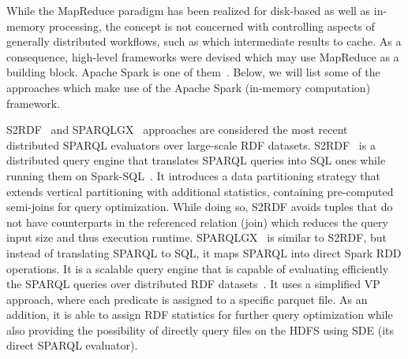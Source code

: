 While the MapReduce paradigm has been realized for disk-based as well as in-memory processing, the concept is not concerned with controlling aspects of generally distributed workflows, such as which intermediate results to cache. 
As a consequence, high-level frameworks were devised which may use MapReduce as a building block.
Apache Spark is one of them~\cite{zaharia2012resilient}.
Below, we will list some of the approaches which make use of the Apache Spark (in-memory computation) framework.

S2RDF~\cite{Schatzle:2016:SRQ:2977797.2977806} and SPARQLGX~\cite{sparqlgx-iswc-2016} approaches are considered the most recent distributed \gls{SPARQL} evaluators over large-scale \gls{RDF} datasets.
S2RDF~\cite{Schatzle:2016:SRQ:2977797.2977806} is a distributed query engine that translates \gls{SPARQL} queries into SQL ones while running them on Spark-SQL~\cite{Armbrust2015SSR}. 
It introduces a data partitioning strategy that extends vertical partitioning with additional statistics, containing pre-computed semi-joins for query optimization.
While doing so, S2RDF avoids tuples that do not have counterparts in the referenced relation (join) which reduces the query input size and thus execution runtime.
SPARQLGX~\cite{sparqlgx-iswc-2016} is similar to S2RDF, but instead of translating \gls{SPARQL} to SQL, it maps \gls{SPARQL} into direct Spark \gls{RDD} operations. 
It is a scalable query engine that is capable of evaluating efficiently the \gls{SPARQL} queries over distributed \gls{RDF} datasets~\cite{graux2018multi}.
It uses a simplified \gls{VP} approach, where each predicate is assigned to a specific parquet file. 
As an addition, it is able to assign \gls{RDF} statistics for further query optimization while also providing the possibility of directly query files on the \gls{HDFS} using SDE (its direct \gls{SPARQL} evaluator).

